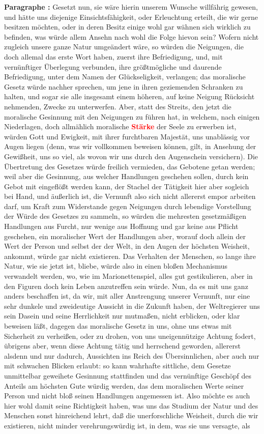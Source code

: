 \documentclass[a4paper,12pt,twoside]{book}
\newcommand{\match}[1]{\textcolor{red}{\textbf{#1}}}
\begin{document}
	\noindent\textbf{Paragraphe : }Gesetzt nun, sie wäre hierin unserem Wunsche willfährig gewesen, und hätte uns diejenige Einsichtsfähigkeit, oder Erleuchtung erteilt, die wir gerne besitzen möchten, oder in deren Besitz einige wohl gar wähnen sich wirklich zu befinden, was würde allem Ansehn nach wohl die Folge hievon sein? Wofern nicht zugleich unsere ganze Natur umgeändert wäre, so würden die Neigungen, die doch allemal das erste Wort haben, zuerst ihre Befriedigung, und, mit vernünftiger Überlegung verbunden, ihre größtmögliche und daurende Befriedigung, unter dem Namen der Glückseligkeit, verlangen; das moralische Gesetz würde nachher sprechen, um jene in ihren geziemenden Schranken zu halten, und sogar sie alle insgesamt einem höheren, auf keine Neigung Rücksicht nehmenden, Zwecke zu unterwerfen.  Aber, statt des Streits, den jetzt die moralische Gesinnung mit den Neigungen zu führen hat, in welchem, nach einigen Niederlagen, doch allmählich moralische \match{Stärke} der Seele zu erwerben ist, würden Gott und Ewigkeit, mit ihrer furchtbaren Majestät, uns unablässig vor Augen liegen (denn, was wir vollkommen beweisen können, gilt, in Ansehung der Gewißheit, uns so viel, als wovon wir uns durch den Augenschein versichern). Die Übertretung des Gesetzes würde freilich vermieden, das Gebotene getan werden; weil aber die Gesinnung, aus welcher Handlungen geschehen sollen, durch kein Gebot mit eingeflößt werden kann, der Stachel der Tätigkeit hier aber sogleich bei Hand, und äußerlich ist, die Vernunft also sich nicht allererst empor arbeiten darf, um Kraft zum Widerstande gegen Neigungen durch lebendige Vorstellung der Würde des Gesetzes zu sammeln, so würden die mehresten gesetzmäßigen Handlungen aus Furcht, nur wenige aus Hoffnung und gar keine aus Pflicht geschehen, ein moralischer Wert der Handlungen aber, worauf doch allein der Wert der Person und selbst der der Welt, in den Augen der höchsten Weisheit, ankommt, würde gar nicht existieren. Das Verhalten der Menschen, so lange ihre Natur, wie sie jetzt ist, bliebe, würde also in einen bloßen Mechanismus verwandelt werden, wo, wie im Marionettenspiel, alles gut gestikulieren, aber in den Figuren doch kein Leben anzutreffen sein würde. Nun, da es mit uns ganz anders beschaffen ist, da wir, mit aller Anstrengung unserer Vernunft, nur eine sehr dunkele und zweideutige Aussicht in die Zukunft haben, der Weltregierer uns sein Dasein und seine Herrlichkeit nur mutmaßen, nicht erblicken, oder klar beweisen läßt, dagegen das moralische Gesetz in uns, ohne uns etwas mit Sicherheit zu verheißen, oder zu drohen, von uns uneigennützige Achtung fodert, übrigens aber, wenn diese Achtung tätig und herrschend geworden, allererst alsdenn und nur dadurch, Aussichten ins Reich des Übersinnlichen, aber auch nur mit schwachen Blicken erlaubt: so kann wahrhafte sittliche, dem Gesetze unmittelbar geweihete Gesinnung stattfinden und das vernünftige Geschöpf des Anteils am höchsten Gute würdig  werden, das dem moralischen Werte seiner Person und nicht bloß seinen Handlungen angemessen ist. Also möchte es auch hier wohl damit seine Richtigkeit haben, was uns das Studium der Natur und des Menschen sonst hinreichend lehrt, daß die unerforschliche Weisheit, durch die wir existieren, nicht minder verehrungswürdig ist, in dem, was sie uns versagte, als 
\end{document}
